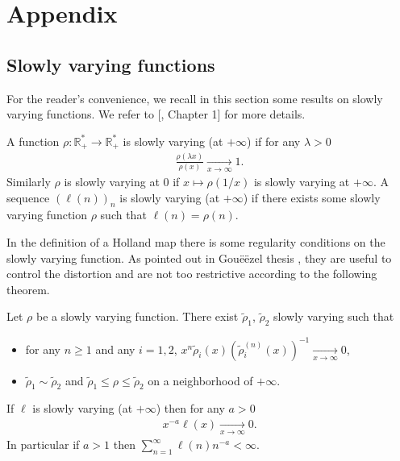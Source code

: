 \documentclass{ws-sd}
\newcommand\bigp[1]{\left(#1\right)}
\renewcommand{\Tilde}{\widetilde}
\begin{document}
\setcounter{section}{0}
\renewcommand{\thesection}{\Alph{section}}
\section{Appendix}
\subsection{Slowly varying functions}
    \label{annex:slowlyvar}
For the reader's convenience, we recall in this section some results on slowly varying functions. We refer to [, Chapter 1] for more details.
\begin{definition}
    A function $\rho : \mathbb{R}_{+}^{*} \longrightarrow \mathbb{R}_{+}^{*}$ is slowly varying (at $+\infty$) if for any $\lambda > 0$
    \begin{align*}
        \frac{\rho(\lambda x)}{\rho(x)} \underset{x \to \infty}{\longrightarrow} 1.
    \end{align*}
    Similarly $\rho$ is slowly varying at $0$ if $x \mapsto \rho(1/x)$ is slowly varying at $+ \infty$. A sequence $(\ell(n))_n$ is slowly varying (at $+ \infty$) if there exists some slowly varying function $\rho$ such that $\ell(n) = \rho(n)$.
\end{definition}
In the definition of a Holland map there is some regularity conditions on the slowly varying function. As pointed out in Gou\"eëzel thesis \cite{13}, they are useful to control the distortion and are not too restrictive according to the following theorem.
\begin{theorem}
    Let $\rho$ be a slowly varying function. There exist $\Tilde{\rho}_1$, $\Tilde{\rho}_2$ slowly varying such that
    \begin{itemize}
        \item for any $n \ge 1$ and any $i= 1,2$, $x^n{\Tilde{\rho}_i(x)}\bigp{\Tilde{\rho}_i^{(n)}(x)}^{-1} \underset{x \to \infty}{\longrightarrow} 0$,
        \item $\Tilde{\rho}_1 \sim \Tilde{\rho}_2$ and $\Tilde{\rho}_1 \le \rho  \le \Tilde{\rho}_2$ on a neighborhood of $+\infty$.
    \end{itemize}
\end{theorem}

\begin{lemma}\label{subpolynomial}
    If $\ell$ is slowly varying (at $+\infty$) then for any $a >0$
    \begin{align*}
        x^{-a}\ell(x) \underset{x \to \infty}{\longrightarrow} 0.
    \end{align*}
    In particular if $a > 1$ then $\sum_{n=1}^{\infty}\ell(n)n^{-a} < \infty$.
\end{lemma}
\end{document}
